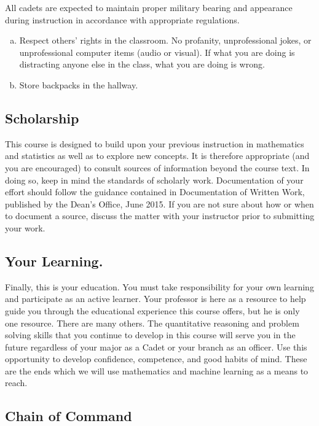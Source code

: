 \documentclass[11pt]{article}
\theoremstyle{plain}
\theoremstyle{definition}
\begin{document}
All cadets are expected to maintain proper military bearing and appearance during instruction in accordance with appropriate regulations.

\begin{enumerate}[a.]
\item Respect others’ rights in the classroom. No profanity, unprofessional jokes, or unprofessional computer items (audio or visual). If what you are doing is distracting anyone else in the class, what you are doing is wrong.
\item Store backpacks in the hallway.
\end{enumerate}

\subsection{Scholarship}

This course is designed to build upon your previous instruction in mathematics and statistics as well as to explore new concepts.  It is therefore appropriate (and you are encouraged) to consult sources of information beyond the course text.  In doing so, keep in mind the standards of scholarly work.  Documentation of your effort should follow the guidance contained in Documentation of Written Work, published by the Dean’s Office, June 2015.  If you are not sure about how or when to document a source, discuss the matter with your instructor prior to submitting your work.

\subsection{Your Learning.}

Finally, this is your education. You must take responsibility for your own learning and participate as an active learner.  Your professor is here as a resource to help guide you through the educational experience this course offers, but he is only one resource.  There are many others.  The quantitative reasoning and problem solving skills that you continue to develop in this course will serve you in the future regardless of your major as a Cadet or your branch as an officer.  Use this opportunity to develop confidence, competence, and good habits of mind.  These are the ends which we will use mathematics and machine learning as a means to reach.

\subsection{Chain of Command}
\end{document}
